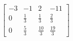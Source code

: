 \documentclass[preview]{standalone}
\begin{document}
\begin{align*}
\left[\begin{array}{ccc|c}-3 & -1 & 2 & -11 \\0 & \frac{1}{3} & \frac{1}{3} & \frac{2}{3} \\0 & \frac{5}{3} & \frac{10}{3} & \frac{19}{3}\end{array}\right]
\end{align*}
\end{document}
